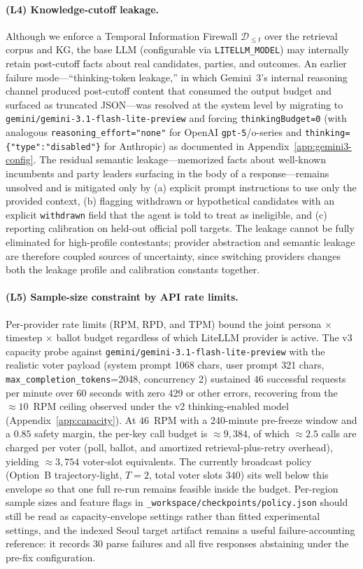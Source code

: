 \documentclass[11pt]{article}
\begin{document}
\paragraph{(L4) Knowledge-cutoff leakage.}
Although we enforce a Temporal Information Firewall $\mathcal{D}_{\le t}$ over the retrieval corpus and KG, the base LLM (configurable via \texttt{LITELLM\_MODEL}) may internally retain post-cutoff facts about real candidates, parties, and outcomes. An earlier failure mode---``thinking-token leakage,'' in which Gemini~3's internal reasoning channel produced post-cutoff content that consumed the output budget and surfaced as truncated JSON---was resolved at the system level by migrating to \texttt{gemini/gemini-3.1-flash-lite-preview} and forcing \texttt{thinkingBudget=0} (with analogous \texttt{reasoning\_effort="none"} for OpenAI \texttt{gpt-5}/o-series and \texttt{thinking=\{"type":"disabled"\}} for Anthropic) as documented in Appendix~\ref{app:gemini3-config}. The residual semantic leakage---memorized facts about well-known incumbents and party leaders surfacing in the body of a response---remains unsolved and is mitigated only by (a) explicit prompt instructions to use only the provided context, (b) flagging withdrawn or hypothetical candidates with an explicit \texttt{withdrawn} field that the agent is told to treat as ineligible, and (c) reporting calibration on held-out official poll targets. The leakage cannot be fully eliminated for high-profile contestants; provider abstraction and semantic leakage are therefore coupled sources of uncertainty, since switching providers changes both the leakage profile and calibration constants together.

\paragraph{(L5) Sample-size constraint by API rate limits.}
Per-provider rate limits (RPM, RPD, and TPM) bound the joint persona $\times$ timestep $\times$ ballot budget regardless of which LiteLLM provider is active. The v3 capacity probe against \texttt{gemini/gemini-3.1-flash-lite-preview} with the realistic voter payload (system prompt 1068 chars, user prompt 321 chars, \texttt{max\_completion\_tokens}=2048, concurrency 2) sustained $46$ successful requests per minute over 60 seconds with zero 429 or other errors, recovering from the $\approx 10$~RPM ceiling observed under the v2 thinking-enabled model (Appendix~\ref{app:capacity}). At $46$~RPM with a 240-minute pre-freeze window and a $0.85$ safety margin, the per-key call budget is $\approx 9{,}384$, of which $\approx 2.5$ calls are charged per voter (poll, ballot, and amortized retrieval-plus-retry overhead), yielding $\approx 3{,}754$ voter-slot equivalents. The currently broadcast policy (Option~B trajectory-light, $T=2$, total voter slots $340$) sits well below this envelope so that one full re-run remains feasible inside the budget. Per-region sample sizes and feature flags in \texttt{\_workspace/checkpoints/policy.json} should still be read as capacity-envelope settings rather than fitted experimental settings, and the indexed Seoul target artifact remains a useful failure-accounting reference: it records 30 parse failures and all five responses abstaining under the pre-fix configuration.
\end{document}
